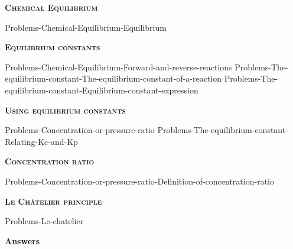 \documentclass[main.tex]{subfiles}
\newcommand\chapterlabel{Ch-equilibrium}
\begin{document}
\newpage

\fancyhfoffset[E,O]{0pt}
\setlength{\columnsep}{30pt}
\begin{conclusion}
\end{conclusion}
\begin{multicols*}{2}\setcounter{numA}{1}



{\raggedright\textsc{\textbf{Chemical Equilibrium }}\par}
{Problems-Chemical-Equilibrium-Equilibrium}



{\raggedright\textsc{\textbf{Equilibrium constants }}\par}
{Problems-Chemical-Equilibrium-Forward-and-reverse-reactions}
{Problems-The-equilibrium-constant-The-equilibrium-constant-of-a-reaction}
{Problems-The-equilibrium-constant-Equilibrium-constant-expression}

{\raggedright\textsc{\textbf{Using equilibrium constants }}\par}
{Problems-Concentration-or-pressure-ratio}
{Problems-The-equilibrium-constant-Relating-Kc-and-Kp}

{\raggedright\textsc{\textbf{Concentration ratio }}\par}
{Problems-Concentration-or-pressure-ratio-Definition-of-concentration-ratio}


{\raggedright\textsc{\textbf{Le Ch\^{a}telier principle}}\par}
{Problems-Le-chatelier}









\end{multicols*}

\newpage
\begin{answersenvironment}
\begin{minipage}[c]{1\textwidth}
\begin{localsize}{10}
{\Large \bf Answers}
 \printsolutions[byID={1,3,5,7,9,11,13,15,17}]
\end{localsize}
\end{minipage}\end{answersenvironment}
\end{document}
